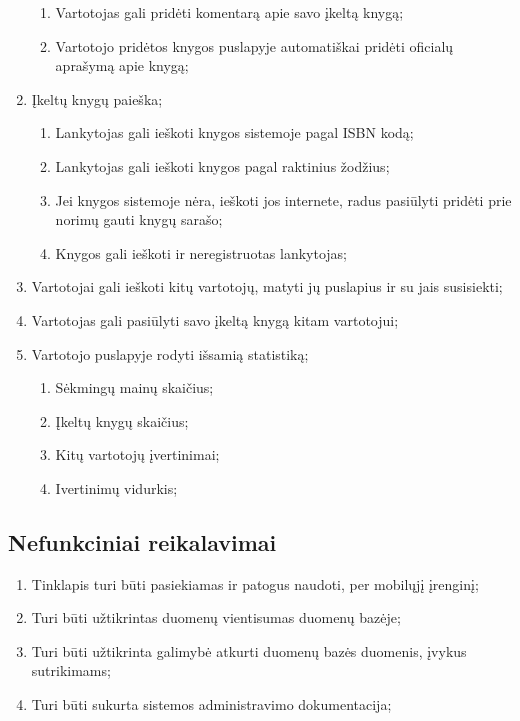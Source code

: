 \documentclass{VUMIFPSkursinis}
\begin{document}
\begin{enumerate}[label=\textbf{FR\arabic*}]
\begin{enumerate}[label*=\textbf{.\arabic*}]
				\item Vartotojas gali pridėti komentarą apie savo įkeltą knygą;
				\item Vartotojo pridėtos knygos puslapyje automatiškai pridėti oficialų aprašymą apie knygą;
			\end{enumerate}
		\item Įkeltų knygų paieška;
			\begin{enumerate}[label*=\textbf{.\arabic*}]
				\item Lankytojas gali ieškoti knygos sistemoje pagal ISBN kodą;
				\item Lankytojas gali ieškoti knygos pagal raktinius žodžius;
				\item Jei knygos sistemoje nėra, ieškoti jos internete, radus pasiūlyti pridėti
					prie norimų gauti knygų sarašo;
				\item Knygos gali ieškoti ir neregistruotas lankytojas;
			\end{enumerate}
		\item Vartotojai gali ieškoti kitų vartotojų, matyti jų puslapius ir su jais susisiekti;
		\item Vartotojas gali pasiūlyti savo įkeltą knygą kitam vartotojui;
		\item Vartotojo puslapyje rodyti išsamią statistiką;
			\begin{enumerate}[label*=\textbf{.\arabic*}]
				\item Sėkmingų mainų skaičius;
				\item Įkeltų knygų skaičius; 
				\item Kitų vartotojų įvertinimai;
				\item Ivertinimų vidurkis;
			\end{enumerate}
	\end{enumerate}
\subsection{Nefunkciniai reikalavimai}
	\begin{enumerate}[label=\textbf{NFR\arabic*}]
		\item Tinklapis turi būti pasiekiamas ir patogus naudoti, per mobilųjį įrenginį;
		\item Turi būti užtikrintas duomenų vientisumas duomenų bazėje;
		\item Turi būti užtikrinta galimybė atkurti duomenų bazės duomenis, įvykus sutrikimams;
		\item Turi būti sukurta sistemos administravimo dokumentacija;
	\end{enumerate}
\end{document}
